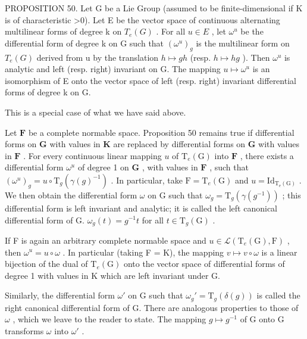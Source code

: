 PROPOSITION 50. Let G be a Lie Group (assumed to be finite-dimensional if K is of characteristic \textgreater0). Let E be the vector space of continuous alternating multilinear forms of degree k on \(T_{e}(G)\) . For all \(u \in E\) , let \(\omega^{u}\) be the differential form of degree k on G such that \((\omega^{u})_{g}\) is the multilinear form on \(T_{e}(G)\) derived from u by the translation \(h \mapsto gh\) (resp. \(h \mapsto hg\) ). Then \(\omega^{u}\) is analytic and left (resp. right) invariant on G. The mapping \(u \mapsto \omega^{u}\) is an isomorphism of E onto the vector space of left (resp. right) invariant differential forms of degree k on G.

This is a special case of what we have said above.

Let \(\mathbf{F}\) be a complete normable space. Proposition 50 remains true if differential forms on \(\mathbf{G}\) with values in \(\mathbf{K}\) are replaced by differential forms on \(\mathbf{G}\) with values in \(\mathbf{F}\) . For every continuous linear mapping \(u\) of \(\mathrm{T}_e(\mathrm{G})\) into \(\mathbf{F}\) , there exists a differential form \(\omega^u\) of degree 1 on \(\mathbf{G}\) , with values in \(\mathbf{F}\) , such that \((\omega^{u})_{g} = u \circ \mathrm{T}_{g}(\gamma(g)^{-1})\) . In particular, take \(\mathrm{F} = \mathrm{T}_e(\mathrm{G})\) and \(u = \mathrm{Id}_{\mathrm{T_e(G)}}\) . We then obtain the differential form \(\omega\) on G such that \(\omega_{g} = \mathrm{T}_{g}(\gamma (g^{-1}))\) ; this differential form is left invariant and analytic; it is called the left canonical differential form of G. \(\omega_{g}(t) = g^{-1}t\) for all \(t\in \mathrm{T}_g(\mathrm{G})\) .

If F is again an arbitrary complete normable space and \(u \in \mathcal{L}(\mathrm{T}_{e}(\mathrm{G}), \mathrm{F})\) , then \(\omega^{u} = u \circ \omega\) . In particular (taking F = K), the mapping \(v \mapsto v \circ \omega\) is a linear bijection of the dual of \(\mathrm{T}_{e}(\mathrm{G})\) onto the vector space of differential forms of degree 1 with values in K which are left invariant under G.

Similarly, the differential form \(\omega'\) on G such that \(\omega_g' = \mathrm{T}_g(\delta(g))\) is called the right canonical differential form of G. There are analogous properties to those of \(\omega\) , which we leave to the reader to state. The mapping \(g \mapsto g^{-1}\) of G onto G transforms \(\omega\) into \(\omega'\) .


